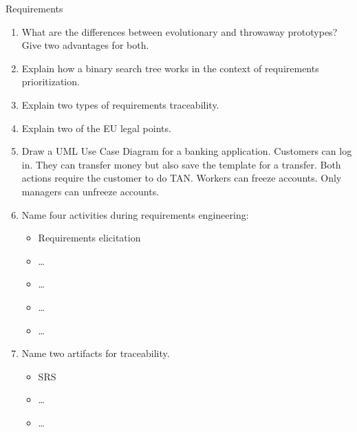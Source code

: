 \documentclass{article}
\begin{document}
\begin{exercise}{Requirements}
  \begin{enumerate}
    \item What are the differences between evolutionary and throwaway prototypes? Give two advantages for both.
    \item Explain how a binary search tree works in the context of requirements prioritization.
    \item Explain two types of requirements traceability.
    \item Explain two of the EU legal points.
    \item Draw a UML Use Case Diagram for a banking application. Customers can log in. They can transfer money but also save the template for a transfer. Both actions require the customer to do TAN. Workers can freeze accounts. Only managers can unfreeze accounts.
    \item Name four activities during requirements engineering:
      \begin{itemize}
        \item Requirements elicitation
        \item …
        \item …
        \item …
        \item …
      \end{itemize}
    \item Name two artifacts for traceability.
      \begin{itemize}
        \item SRS
        \item …
        \item …
      \end{itemize}
  \end{enumerate}

  \begin{solution}
  \end{solution}
\end{exercise}
\end{document}
